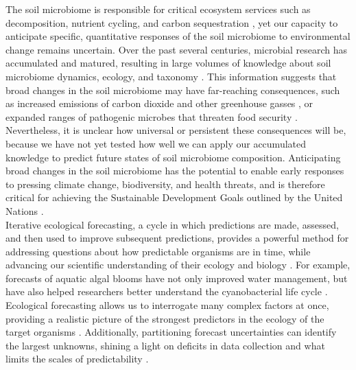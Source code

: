 \documentclass[11pt]{article}
\begin{document}
The soil microbiome is responsible for critical ecosystem services such as decomposition, nutrient cycling, and carbon sequestration \cite{jansson_soil_2020,Gougoulias2014}, yet our capacity to anticipate specific, quantitative responses of the soil microbiome to environmental change remains uncertain. Over the past several centuries, microbial research has accumulated and matured, resulting in large volumes of knowledge about soil microbiome dynamics, ecology, and taxonomy \cite{hooke_micrographia_1665,van_leewenhoeck_observations_1677,winogradsky_s_researches_1891}. This information suggests that broad changes in the soil microbiome may have far-reaching consequences, such as increased emissions of carbon dioxide and other greenhouse gasses \cite{Wieder2013,lajtha_chapter_2018}, or expanded ranges of pathogenic microbes that threaten food security \cite{schaad_emerging_2008,delgado-baquerizo_proportion_2020}. Nevertheless, it is unclear how universal or persistent these consequences will be, because we have not yet tested how well we can apply our accumulated knowledge to predict future states of soil microbiome composition. Anticipating broad changes in the soil microbiome has the potential to enable early responses to pressing climate change, biodiversity, and health threats, and is therefore critical for achieving the Sustainable Development Goals outlined by the United Nations \cite{fao_state_2020}. \\
Iterative ecological forecasting, a cycle in which predictions are made, assessed, and then used to improve subsequent predictions, provides a powerful method for addressing questions about how predictable organisms are in time, while advancing our scientific understanding of their ecology and biology \cite{dietze_prediction_2017,dietze_iterative_2018}. For example, forecasts of aquatic algal blooms have not only improved water management, but have also helped researchers better understand the cyanobacterial life cycle \cite{dietze_ecological_2019,lofton_using_2022}. Ecological forecasting allows us to interrogate many complex factors at once, providing a realistic picture of the strongest predictors in the ecology of the target organisms \cite{currie_where_2019}. Additionally, partitioning forecast uncertainties can identify the largest unknowns, shining a light on deficits in data collection and what limits the scales of predictability \cite{dietze_ecological_2019,averill_soil_2021}.  \\
\end{document}

